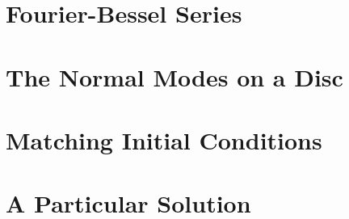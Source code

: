 \documentclass{paper}
\begin{document}
\section{Fourier-Bessel Series}
\section{The Normal Modes on a Disc}
\section{Matching Initial Conditions}
\section{A Particular Solution}


\end{document}
